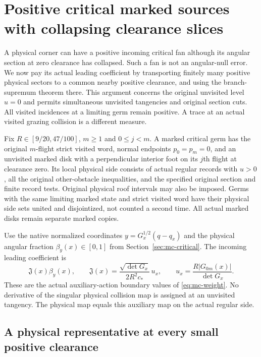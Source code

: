 \section{Positive critical marked sources with collapsing clearance slices}
\label{pc:section}

A physical corner can have a positive incoming critical fan although
its angular section at zero clearance has collapsed. Such a fan is
not an angular-null error. We now pay its actual leading coefficient
by transporting finitely many positive physical sectors to a common
nearby positive clearance, and using the branch-supremum theorem there.
This argument concerns the original unvisited level $u=0$ and permits
simultaneous unvisited tangencies and original section cuts. All
visited incidences at a limiting germ remain positive. A trace at
an actual visited grazing collision is a different measure.

Fix $R\in[9/20,47/100]$, $m\ge1$ and $0\le j<m$. A marked
critical germ has the original $m$-flight strict visited word,
normal endpoints $p_0=p_m=0$, and an unvisited marked disk with
a perpendicular interior foot on its $j$th flight at clearance
zero. Its local physical side consists of actual regular records
with $u>0$, all the original other-obstacle inequalities, and the
specified original section and finite record tests. Original
physical roof intervals may also be imposed. Germs with the same
limiting marked state and strict visited word have their physical
side sets united and disjointized, not counted a second time.
All actual marked disks remain separate marked copies.

Use the native normalized coordinates
$y=G_x^{1/2}(q-q_x)$ and the physical angular fraction
$\beta_y(x)\in[0,1]$ from Section~\ref{sec:mc-critical}.
The incoming leading coefficient is
\begin{equation}\label{pc:coefficient}
 \mathfrak J(x)\beta_y(x),\qquad
 \mathfrak J(x)=\frac{\sqrt{\det G_x}}{2R^2c_*}\,u_x,
 \qquad
 u_x=\frac{R|G_{0m}(x)|}{\det G_x}.
\end{equation}
These are the actual auxiliary-action boundary values of
\eqref{eq:mc-weight}. No derivative of the singular physical
collision map is assigned at an unvisited tangency. The physical
map equals this auxiliary map on the actual regular side.

\subsection{A physical representative at every small positive clearance}

